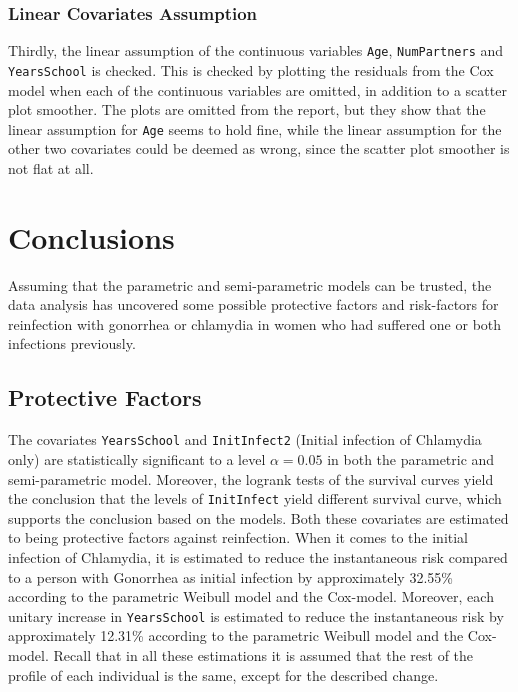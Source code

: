 \documentclass[
]{article}
\begin{document}
\hypertarget{linear-covariates-assumption}{%
\subsubsection{Linear Covariates Assumption}\label{linear-covariates-assumption}}

Thirdly, the linear assumption of the continuous variables \texttt{Age}, \texttt{NumPartners} and \texttt{YearsSchool} is checked. This is checked by plotting the residuals from the Cox model when each of the continuous variables are omitted, in addition to a scatter plot smoother. The plots are omitted from the report, but they show that the linear assumption for \texttt{Age} seems to hold fine, while the linear assumption for the other two covariates could be deemed as wrong, since the scatter plot smoother is not flat at all.

\hypertarget{conclusions}{%
\section{Conclusions}\label{conclusions}}

Assuming that the parametric and semi-parametric models can be trusted, the data analysis has uncovered some possible protective factors and risk-factors for reinfection with gonorrhea or chlamydia in women who had suffered one or both infections previously.

\hypertarget{protective-factors}{%
\subsection{Protective Factors}\label{protective-factors}}

The covariates \texttt{YearsSchool} and \texttt{InitInfect2} (Initial infection of Chlamydia only) are statistically significant to a level \(\alpha = 0.05\) in both the parametric and semi-parametric model. Moreover, the logrank tests of the survival curves yield the conclusion that the levels of \texttt{InitInfect} yield different survival curve, which supports the conclusion based on the models. Both these covariates are estimated to being protective factors against reinfection. When it comes to the initial infection of Chlamydia, it is estimated to reduce the instantaneous risk compared to a person with Gonorrhea as initial infection by approximately 32.55\% according to the parametric Weibull model and the Cox-model. Moreover, each unitary increase in \texttt{YearsSchool} is estimated to reduce the instantaneous risk by approximately 12.31\% according to the parametric Weibull model and the Cox-model. Recall that in all these estimations it is assumed that the rest of the profile of each individual is the same, except for the described change.
\end{document}
